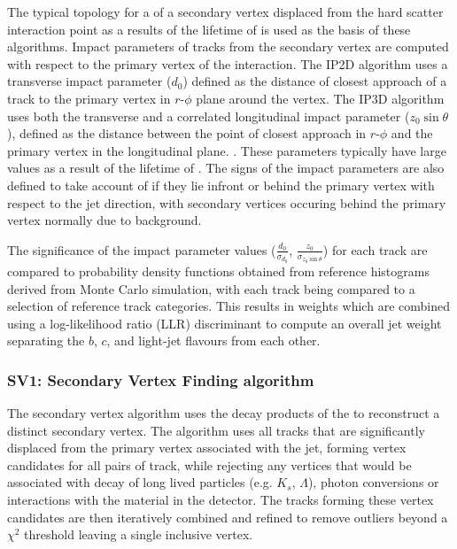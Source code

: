 		The typical topology for a \bhadron of a secondary vertex displaced from the hard scatter interaction point as a results of the lifetime of \bquark is used as the basis of these algorithms. Impact parameters of tracks from the secondary vertex are computed with respect to the primary vertex of the interaction. The IP2D algorithm uses a transverse impact parameter ($d_0$) defined as the distance of closest approach of a track to the  primary vertex in $r$-$\phi$ plane around the vertex. The IP3D algorithm uses both the transverse and a correlated longitudinal impact parameter ($z_0\sin\theta$), defined as the distance between the point of closest approach in $r$-$\phi$ and the primary vertex in the longitudinal plane. . These parameters typically have large values as a result of the lifetime of \bquark. The signs of the impact parameters are also defined to take account of if they lie infront or behind the primary vertex with respect to the jet direction, with secondary vertices occuring behind the primary vertex normally due to background.
		
		The significance of the impact parameter values ($\frac{d_0}{\sigma_{d_0}}$, $\frac{z_0}{\sigma_{z_0\sin\theta}}$) for each track are compared to probability density functions obtained from reference histograms derived from Monte Carlo simulation, with each track being compared to a selection of reference track categories. This results in weights which are combined using a log-likelihood ratio (LLR) discriminant to compute an overall jet weight separating the $b$, $c$, and light-jet flavours from each other. \cite{btagOptimisation, bTagPerformance}
		
	\subsubsection{SV1: Secondary Vertex Finding algorithm}
	\label{det:btag:sv}
	
		The secondary vertex algorithm uses the decay products of the \bhadron to reconstruct a distinct secondary vertex. The algorithm uses all tracks that are significantly displaced from the primary vertex associated with the jet, forming vertex candidates for all pairs of track, while rejecting any vertices that would be associated with decay of long lived particles (e.g. $K_s$, $\Lambda$), photon conversions or interactions with the material in the detector. The tracks forming these vertex candidates are then iteratively combined and refined to remove outliers beyond a $\chi^2$ threshold leaving a single inclusive vertex.
		
